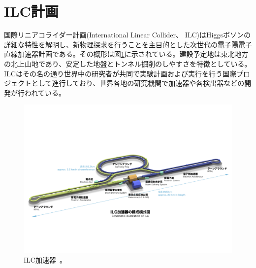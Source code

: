 \section{ILC計画}
国際リニアコライダー計画(International Linear Collider、 ILC)はHiggsボソンの詳細な特性を解明し、新物理探求を行うことを主目的とした次世代の電子陽電子直線加速器計画である。その概形は図\ref{ILCaccelerator}に示されている。建設予定地は東北地方の北上山地であり、安定した地盤とトンネル掘削のしやすさを特徴としている。ILCはその名の通り世界中の研究者が共同で実験計画および実行を行う国際プロジェクトとして進行しており、世界各地の研究機関で加速器や各検出器などの開発が行われている。

\begin{figure}[h]
	\begin{center}
		\includegraphics[width=350pt]{./Figure/Introduction/image_02.jpg}
		\caption[ILC加速器]{ILC加速器~\cite{StandardModel}。}
		\label{ILCaccelerator}
	\end{center}
\end{figure}


